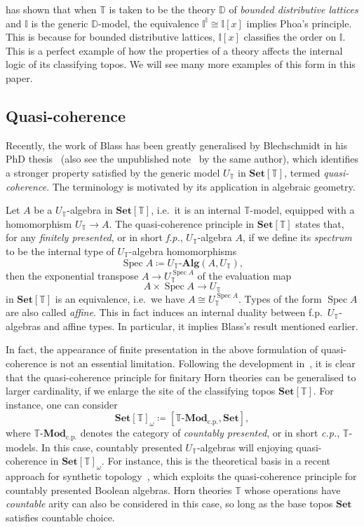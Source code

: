 \documentclass[a4paper,12pt]{amsart}
\theoremstyle{definition}
\newcommand{\mb}[1]{\mathbf{#1}}
\newcommand{\mbb}[1]{\mathbb{#1}}
\newcommand{\T}{\mbb T}
\newcommand{\I}{\mbb I}
\newcommand{\mr}[1]{\mathrm{#1}}
\newcommand{\Set}{\mb{Set}}
\newcommand{\alg}{\text{-}\mb{Alg}}
\newcommand{\cp}{_{\mr{c.p.}}}
\newcommand{\mmod}[1]{#1\text{-}\mathbf{Mod}}
\newcommand{\spec}{\operatorname{Spec}}
\begin{document}
\citet{gratzer2024directed} has shown that when $\T$ is taken to be the theory $\mbb D$ of \emph{bounded distributive lattices} and $\I$ is the generic $\mbb D$-model, the equivalence $\I^\I \cong \I[x]$ implies Phoa's principle. This is because for bounded distributive lattices, $\I[x]$ classifies the order on $\I$. This is a perfect example of how the properties of a theory affects the internal logic of its classifying topos. We will see many more examples of this form in this paper.

\subsection{Quasi-coherence}\label{subsec:qc}

Recently, the work of Blass has been greatly generalised by Blechschmidt in his PhD thesis~\cite{blechschmidt2021using} (also see the unpublished note~\cite{blechschmidt2020general} by the same author), which identifies a stronger property satisfied by the generic model $U_\T$ in $\Set[\T]$, termed \emph{quasi-coherence}. The terminology is motivated by its application in algebraic geometry.

Let $A$ be a $U_\T$-algebra in $\Set[\T]$, i.e.\ it is an internal $\T$-model, equipped with a homomorphism $U_\T \to A$. The quasi-coherence principle in $\Set[\T]$ states that, for any \emph{finitely presented}, or in short \emph{f.p.}, $U_\T$-algebra $A$, if we define its \emph{spectrum} to be the internal type of $U_\T$-algebra homomorphisms
\[ \spec A \coloneq U_\T\alg(A,U_\T), \]
then the exponential transpose $A\to U_\T^{\spec A}$ of the evaluation map \[ A\times \spec A\to U_\T \]  in $\Set[\T]$ is an equivalence, i.e.\ we have $A \cong U_\T^{\spec A}$.
Types of the form $\spec A$ are also called \emph{affine}. This in fact induces an internal duality between f.p.\ $U_\T$-algebras and affine types. In particular, it implies Blass's result mentioned earlier. 

In fact, the appearance of finite presentation in the above formulation of quasi-coherence is not an essential limitation. Following the development in~\cite{blechschmidt2021using,blechschmidt2020general}, it is clear that the quasi-coherence principle for finitary Horn theories can be generalised to larger cardinality, if we enlarge the site of the classifying topos $\Set[\T]$. For instance, one can consider
\[ \Set[\T]_\omega \coloneq [\mmod\T\cp,\Set], \]
where $\mmod\T\cp$ denotes the category of \emph{countably presented}, or in short \emph{c.p.}, $\T$-models. In this case, countably presented $U_\T$-algebras will enjoying quasi-coherence in $\Set[\T]_\omega$. For instance, this is the theoretical basis in a recent approach for synthetic topology~\cite{cherubini2024foundation}, which exploits the quasi-coherence principle for countably presented Boolean algebras. Horn theories $\T$ whose operations have \emph{countable} arity can also be considered in this case, so long as the base topos $\Set$ satisfies countable choice.
\end{document}
